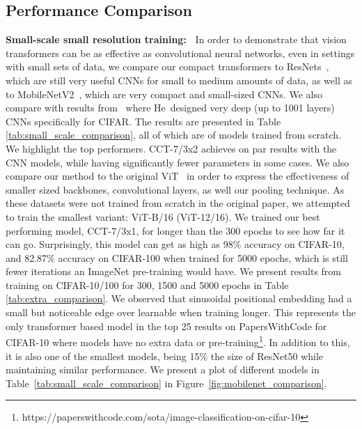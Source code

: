 \documentclass[10pt,twocolumn,letterpaper]{article}
\begin{document}
\subsection{Performance Comparison}
\textbf{Small-scale small resolution training:~} In order to demonstrate that vision transformers can be as effective as convolutional neural networks, even in settings with small sets of data, we compare our compact transformers to ResNets~\cite{he2016deep}, which are still very useful CNNs for small to medium amounts of data, as well as to MobileNetV2~\cite{sandler2018mobilenetv2}, which are very compact and small-sized CNNs. We also compare with results from~\cite{he2016identity} where He~\etal designed very deep (up to 1001 layers) CNNs specifically for CIFAR. The results are presented in Table \ref{tab:small_scale_comparison}, all of which are of models trained from scratch. We highlight the top performers. CCT-7/3x2 achieves on par results with the CNN models, while having significantly fewer parameters in some cases.
We also compare our method to the original ViT~\cite{dosovitskiy2020image} in order to express the effectiveness of smaller sized backbones, convolutional layers, as well our pooling technique. As these datasets were not trained from scratch in the original paper, we attempted to train the smallest variant: ViT-B/16 (ViT-12/16).
We trained our best performing model, CCT-7/3x1, for longer than the 300 epochs to see how far it can go. Surprisingly, this model can get as high as 98\% accuracy on CIFAR-10, and 82.87\% accuracy on CIFAR-100 when trained for 5000 epochs, which is still fewer iterations an ImageNet pre-training would have. We present results from training on CIFAR-10/100 for 300, 1500 and 5000 epochs in Table \ref{tab:extra_comparison}. We observed that sinusoidal positional embedding had a small but noticeable edge over learnable when training longer.
This represents the only transformer based model in the top 25 results on PapersWithCode for CIFAR-10 where models have no extra data or pre-training\footnote{https://paperswithcode.com/sota/image-classification-on-cifar-10}. In addition to this, it is also one of the smallest models, being 15\% the size of ResNet50 while maintaining similar performance. We present a plot of different models in Table~\ref{tab:small_scale_comparison} in Figure~\ref{fig:mobilenet_comparison}.
\end{document}

